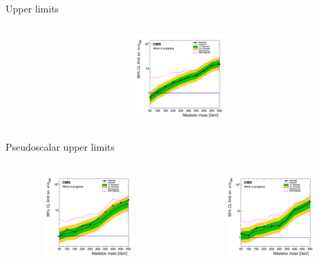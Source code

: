 \documentclass[8pt]{beamer}
\begin{document}
\begin{frame}{Upper limits}
\begin{columns}
\begin{column}{0.33\textwidth}
\begin{center}
     			\includegraphics[width=1.0\textwidth, height=90pt]{figs/limit_scalar_2018_attempt7.png}
    		\end{center}		
		\end{column}
\end{columns}

\begin{columns}
\begin{column}{1.09\textwidth}
\begin{block}{\centering Pseudoscalar upper limits}\end{block}
\end{column}
\end{columns} \vspace{-15pt}
\begin{columns}
		\begin{column}{0.33\textwidth}
			\begin{center}
     			\includegraphics[width=1.0\textwidth, height=90pt]{figs/limit_pseudo_2016_attempt7.png}
    		\end{center}		
		\end{column}
		\begin{column}{0.33\textwidth}
			\begin{center}
     			\includegraphics[width=1.0\textwidth, height=90pt]{figs/limit_pseudo_2017_attempt7.png}

\end{center}
\end{column}
\end{columns}
\end{frame}
\end{document}
